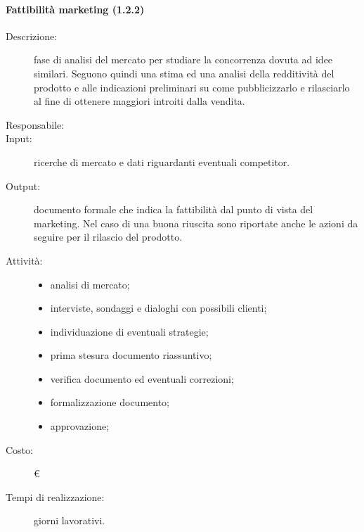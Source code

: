 \paragraph{Fattibilità marketing (1.2.2)}
\begin{description}
\item[Descrizione:] fase di analisi del mercato per studiare la concorrenza dovuta ad idee similari. Seguono quindi una stima ed una analisi della redditività del prodotto e alle indicazioni preliminari su come pubblicizzarlo e rilasciarlo al fine di ottenere maggiori introiti dalla vendita.
\item[Responsabile:] 
\item[Input:] ricerche di mercato e dati riguardanti eventuali competitor.
\item[Output:] documento formale che indica la fattibilità dal punto di vista del marketing. Nel caso di una buona riuscita sono riportate anche le azioni da seguire per il rilascio del prodotto.
\item[Attività:]
\begin{itemize}
\item analisi di mercato;
\item interviste, sondaggi e dialoghi con possibili clienti;
\item individuazione di eventuali strategie;
\item prima stesura documento riassuntivo;
\item verifica documento ed eventuali correzioni;
\item formalizzazione documento;
\item approvazione;
\end{itemize}
\item[Costo:] \euro{}
\item[Tempi di realizzazione:]  giorni lavorativi.
\end{description}

